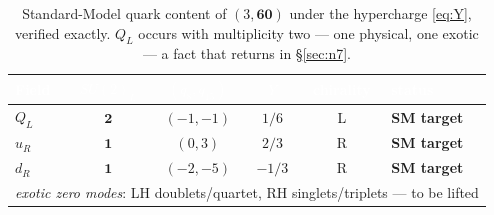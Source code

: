 \documentclass[11pt,a4paper]{article}
\begin{document}
\begin{table}[t]
\centering
{}
\begin{tabular}{lccccl}
\toprule
\rowcolor{hdrblue}
\textcolor{white}{Field} & \textcolor{white}{$SU(2)_L$} & \textcolor{white}{$(q_8,q_{15})$}
& \textcolor{white}{$Y$} & \textcolor{white}{chirality} & \textcolor{white}{status}\\
\midrule
$Q_L$   & $\mathbf{2}$ & $(-1,-1)$ & $1/6$  & L & \textcolor{okgreen}{\textbf{SM target}}\\
$u_R$   & $\mathbf{1}$ & $(0,3)$   & $2/3$  & R & \textcolor{okgreen}{\textbf{SM target}}\\
$d_R$   & $\mathbf{1}$ & $(-2,-5)$ & $-1/3$ & R & \textcolor{okgreen}{\textbf{SM target}}\\
\midrule
\multicolumn{6}{l}{\emph{exotic zero modes}: LH doublets/quartet, RH singlets/triplets --- to be lifted}\\
\bottomrule
\end{tabular}
\caption{Standard-Model quark content of $(3,\mathbf{60})$ under the hypercharge
\eqref{eq:Y}, verified exactly. $Q_L$ occurs with multiplicity two --- one physical,
one exotic --- a fact that returns in \S\ref{sec:n7}.}
\label{tab:smcontent}
\end{table}

\end{document}

